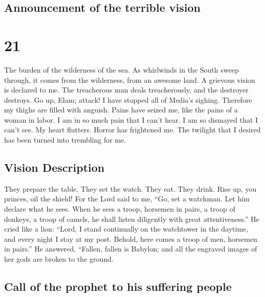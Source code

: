 \hypertarget{announcement-of-the-terrible-vision}{%
\subsection{Announcement of the terrible
vision}\label{announcement-of-the-terrible-vision}}

\hypertarget{section-20}{%
\section{21}\label{section-20}}

 The burden of the wilderness of the sea. As whirlwinds in
the South sweep through, it comes from the wilderness, from an awesome
land.  A grievous vision is declared to me. The
treacherous man deals treacherously, and the destroyer destroys. Go up,
Elam; attack! I have stopped all of Media's sighing. 
Therefore my thighs are filled with anguish. Pains have seized me, like
the pains of a woman in labor. I am in so much pain that I can't hear. I
am so dismayed that I can't see.  My heart flutters.
Horror has frightened me. The twilight that I desired has been turned
into trembling for me.

\hypertarget{vision-description}{%
\subsection{Vision Description}\label{vision-description}}

 They prepare the table. They set the watch. They eat.
They drink. Rise up, you princes, oil the shield!  For the
Lord said to me, ``Go, set a watchman. Let him declare what he sees.
 When he sees a troop, horsemen in pairs, a troop of
donkeys, a troop of camels, he shall listen diligently with great
attentiveness.''  He cried like a lion: ``Lord, I stand
continually on the watchtower in the daytime, and every night I stay at
my post.  Behold, here comes a troop of men, horsemen in
pairs.'' He answered, ``Fallen, fallen is Babylon; and all the engraved
images of her gods are broken to the ground.

\hypertarget{call-of-the-prophet-to-his-suffering-people}{%
\subsection{Call of the prophet to his suffering
people}\label{call-of-the-prophet-to-his-suffering-people}}

